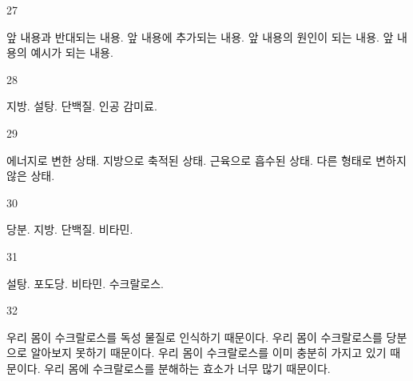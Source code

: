 \documentclass[fs9,seriesFre]{korfarm-base}
\begin{document}
\begin{kfSentenceUnit}{27}{}
\begin{kfChoices}
\kfChoice 앞 내용과 반대되는 내용.
\kfChoice 앞 내용에 추가되는 내용.
\kfChoice 앞 내용의 원인이 되는 내용.
\kfChoice 앞 내용의 예시가 되는 내용.
\end{kfChoices}
\end{kfSentenceUnit}

\begin{kfSentenceUnit}{28}{}
\begin{kfChoices}
\kfChoice 지방.
\kfChoice 설탕.
\kfChoice 단백질.
\kfChoice 인공 감미료.
\end{kfChoices}
\end{kfSentenceUnit}

\begin{kfSentenceUnit}{29}{}
\begin{kfChoices}
\kfChoice 에너지로 변한 상태.
\kfChoice 지방으로 축적된 상태.
\kfChoice 근육으로 흡수된 상태.
\kfChoice 다른 형태로 변하지 않은 상태.
\end{kfChoices}
\end{kfSentenceUnit}

\begin{kfSentenceUnit}{30}{}
\begin{kfChoices}
\kfChoice 당분.
\kfChoice 지방.
\kfChoice 단백질.
\kfChoice 비타민.
\end{kfChoices}
\end{kfSentenceUnit}

\begin{kfSentenceUnit}{31}{}
\begin{kfChoices}
\kfChoice 설탕.
\kfChoice 포도당.
\kfChoice 비타민.
\kfChoice 수크랄로스.
\end{kfChoices}
\end{kfSentenceUnit}

\begin{kfSentenceUnit}{32}{}
\begin{kfChoices}
\kfChoice 우리 몸이 수크랄로스를 독성 물질로 인식하기 때문이다.
\kfChoice 우리 몸이 수크랄로스를 당분으로 알아보지 못하기 때문이다.
\kfChoice 우리 몸이 수크랄로스를 이미 충분히 가지고 있기 때문이다.
\kfChoice 우리 몸에 수크랄로스를 분해하는 효소가 너무 많기 때문이다.
\end{kfChoices}
\end{kfSentenceUnit}
\end{document}
